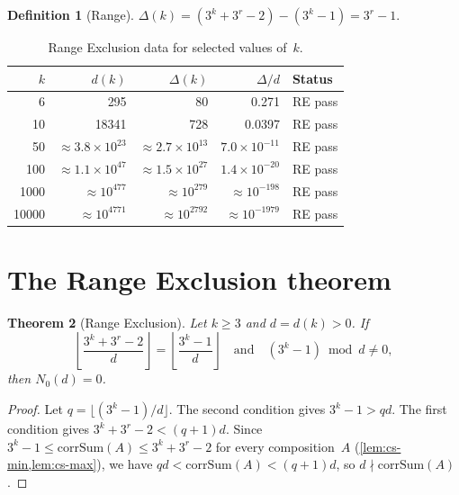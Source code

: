 \documentclass[11pt, a4paper]{amsart}
\theoremstyle{plain}
\newtheorem{theorem}{Theorem}[section]
\theoremstyle{definition}
\newtheorem{definition}[theorem]{Definition}
\theoremstyle{remark}
\newcommand{\corrSum}{\mathrm{corrSum}}
\begin{document}
\begin{definition}[Range]\label{def:range}
  $\Delta(k) = (3^k + 3^r - 2) - (3^k - 1) = 3^r - 1$.
\end{definition}

\begin{table}[ht]
\centering
\caption{Range Exclusion data for selected values of~$k$.}
\label{tab:ratio}
\begin{tabular}{rrrrl}
\toprule
$k$ & $d(k)$ & $\Delta(k)$ & $\Delta/d$ & Status \\
\midrule
6 & 295 & 80 & 0.271 & RE pass \\
10 & 18341 & 728 & 0.0397 & RE pass \\
50 & $\approx 3.8 \times 10^{23}$ & $\approx 2.7 \times 10^{13}$ & $7.0 \times 10^{-11}$ & RE pass \\
100 & $\approx 1.1 \times 10^{47}$ & $\approx 1.5 \times 10^{27}$ & $1.4 \times 10^{-20}$ & RE pass \\
1000 & $\approx 10^{477}$ & $\approx 10^{279}$ & $\approx 10^{-198}$ & RE pass \\
10000 & $\approx 10^{4771}$ & $\approx 10^{2792}$ & $\approx 10^{-1979}$ & RE pass \\
\bottomrule
\end{tabular}
\end{table}

\section{The Range Exclusion theorem}\label{sec:range-exclusion}

\begin{theorem}[Range Exclusion]\label{thm:re}
  Let $k \geq 3$ and $d = d(k) > 0$.  If
  \begin{equation}\label{eq:re-condition}
    \left\lfloor \frac{3^k + 3^r - 2}{d} \right\rfloor
    = \left\lfloor \frac{3^k - 1}{d} \right\rfloor
    \quad\text{and}\quad
    (3^k - 1) \bmod d \neq 0,
  \end{equation}
  then $N_0(d) = 0$.
\end{theorem}

\begin{proof}
  Let $q = \lfloor (3^k - 1)/d \rfloor$.
  The second condition gives $3^k - 1 > qd$.
  The first condition gives $3^k + 3^r - 2 < (q+1)d$.
  Since $3^k - 1 \leq \corrSum(A) \leq 3^k + 3^r - 2$
  for every composition~$A$
  (\cref{lem:cs-min,lem:cs-max}), we have
  $qd < \corrSum(A) < (q+1)d$, so $d \nmid \corrSum(A)$.
\end{proof}
\end{document}
